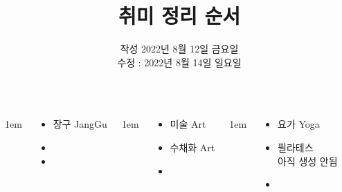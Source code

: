 \documentclass[	20pt, 
							a0paper, 
							landscape,
							margin=0mm, %
							innermargin=10mm,  		%
							blockverticalspace=4mm, %
							colspace=5mm, 
							subcolspace=0mm
							]{tikzposter}
\title{ 취미 정리 순서 }
\author{ 		작성 2022년 8월 12일 금요일 \\
				수정 : 2022년 8월 14일 일요일 }
\begin{document}
	\maketitle[
					width=841mm,
					linewidth = 2mm,
					innersep=4mm,
					titletotopverticalspace=2mm, %
					titletoblockverticalspace=2mm, %
					titletextscale =4, 
				]


	\begin{columns}


			{
					\setlength{\leftmargini}{4em}
					\setlength{\labelsep} {1em}
				\begin{LARGE}
					\begin{itemize}
					\item 장구  JangGu
					\item
					\item
					\end{itemize}
				\end{LARGE}
			} %






			{
					\setlength{\leftmargini}{4em}
					\setlength{\labelsep} {1em}
				\begin{LARGE}
					\begin{itemize}
					\item 미술 Art
					\item 수채화 Art
					\item 
					\end{itemize}
				\end{LARGE}
			} %







			{
					\setlength{\leftmargini}{4em}
					\setlength{\labelsep} {1em}
				\begin{LARGE}
					\begin{itemize}
					\item 요가 Yoga
					\item 필라테스 \\
						아직 생성 안됨
					\item 
					\end{itemize}
				\end{LARGE}
			} %


\end{columns}
\end{document}
